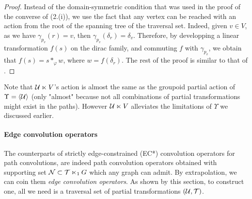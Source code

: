 \begin{proof}
Instead of the domain-symmetric condition that was used in the proof of the converse of  (2.(i)), we use the fact that any vertex can be reached with an action from the root of the spanning tree of the traversal set. Indeed, given $v \in V$, as we have $\gamma_{p_v}(r)=v$, then $\gamma_{p_v}(\delta_r) = \delta_v$. Therefore, by developping a linear transformation $f(s)$ on the dirac family, and commuting $f$ with $\gamma_{p_v}$, we obtain that $f(s) = s \ast_\varphi w$, where $w = f(\delta_r)$. The rest of the proof is similar to that of .
\end{proof}

\begin{remark}
Note that $\mathcal{U} \ltimes V$'s action is almost the same as the groupoid partial action of $\Upsilon = \langle \mathcal{U} \rangle$ (only "almost" because not all combinations of partial transformations might exist in the paths). However $\mathcal{U} \ltimes V$ alleviates the limitations of $\Upsilon$ we discussed earlier.
\end{remark}

\paragraph{Edge convolution operators}
The counterparts of strictly edge-constrained (EC*) convolution operators for path convolutions, are indeed path convolution operators obtained with supporting set $\mathcal{N} \subset \mathcal{T} \ltimes_1 G$ which any graph can admit. By extrapolation, we can coin them \emph{edge convolution operators}. As shown by this section, to construct one, all we need is a traversal set of partial transformations $(\mathcal{U}, \mathcal{T})$.

